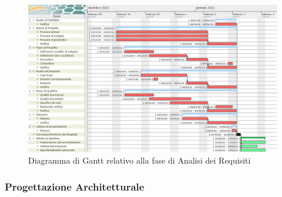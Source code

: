 \begin{figure}[H]
	\centering
	\includegraphics[scale=0.45]{res/images/02_gantt_analisi_requisiti.png}
	\caption{Diagramma di Gantt relativo alla fase di Analisi dei Requisiti}
\end{figure}


\subsubsection{Progettazione Architetturale}

